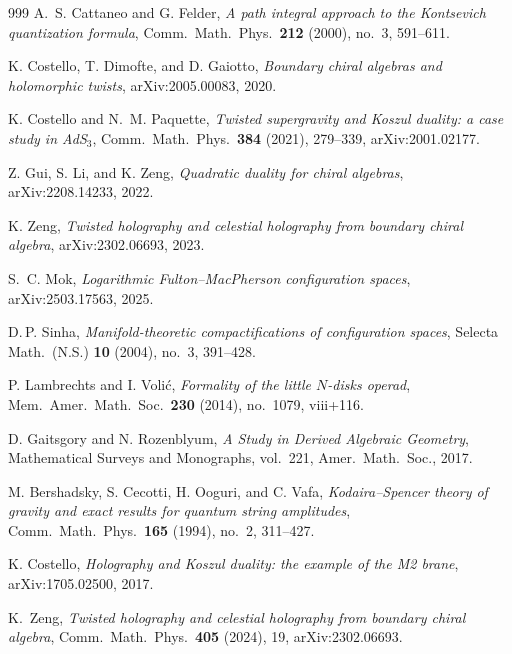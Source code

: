 \documentclass[11pt]{memoir}
\begin{document}
\begin{thebibliography}{999}
A.~S. Cattaneo and G. Felder, \emph{A path integral approach to the Kontsevich quantization formula}, Comm.\ Math.\ Phys.\ \textbf{212} (2000), no.~3, 591--611.

K. Costello, T. Dimofte, and D. Gaiotto, \emph{Boundary chiral algebras and holomorphic twists}, arXiv:2005.00083, 2020.

K. Costello and N.~M. Paquette, \emph{Twisted supergravity and Koszul duality: a case study in AdS$_3$}, Comm.\ Math.\ Phys.\ \textbf{384} (2021), 279--339, arXiv:2001.02177.

Z. Gui, S. Li, and K. Zeng, \emph{Quadratic duality for chiral algebras}, arXiv:2208.14233, 2022.

K. Zeng, \emph{Twisted holography and celestial holography from boundary chiral algebra}, arXiv:2302.06693, 2023.

S.~C. Mok, \emph{Logarithmic Fulton--MacPherson configuration spaces}, arXiv:2503.17563, 2025.

D.\,P. Sinha, \emph{Manifold-theoretic compactifications of configuration spaces},
Selecta Math.\ (N.S.) \textbf{10} (2004), no.~3, 391--428.

P. Lambrechts and I. Voli\'c, \emph{Formality of the little $N$-disks operad},
Mem.\ Amer.\ Math.\ Soc.\ \textbf{230} (2014), no.~1079, viii+116.

D. Gaitsgory and N. Rozenblyum, \emph{A Study in Derived Algebraic Geometry},
Mathematical Surveys and Monographs, vol.~221, Amer.\ Math.\ Soc., 2017.

M. Bershadsky, S. Cecotti, H. Ooguri, and C. Vafa, \emph{Kodaira--Spencer theory of gravity and exact results for quantum string amplitudes}, Comm.\ Math.\ Phys.\ \textbf{165} (1994), no.~2, 311--427.

K. Costello, \emph{Holography and Koszul duality: the example of the M2 brane}, arXiv:1705.02500, 2017.

K.~Zeng, \emph{Twisted holography and celestial holography from boundary chiral algebra}, Comm.\ Math.\ Phys.\ \textbf{405} (2024), 19, arXiv:2302.06693.


\end{thebibliography}
\end{document}
